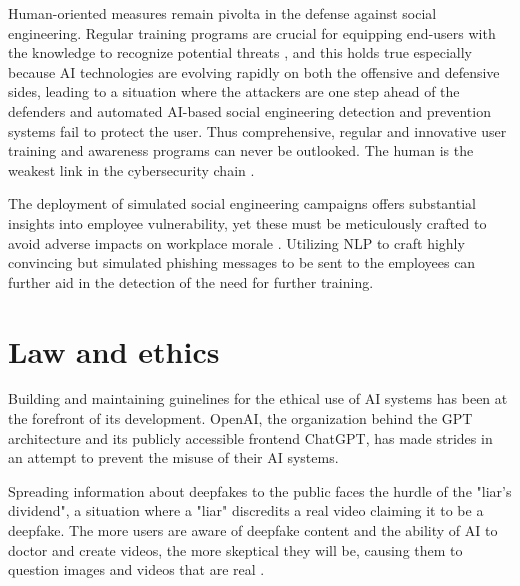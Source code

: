 Human-oriented measures remain pivolta in the defense against social engineering. Regular training programs are crucial for equipping end-users with the knowledge to recognize potential threats \citep{hadnagySocialEngineering2018}, and this holds true especially because AI technologies are evolving rapidly on both the offensive and defensive sides, leading to a situation where the attackers are one step ahead of the defenders and automated AI-based social engineering detection and prevention systems fail to protect the user. Thus comprehensive, regular and innovative user training and awareness programs can never be outlooked. The human is the weakest link in the cybersecurity chain \citep{mitnickArtDeceptionControlling2003}.

The deployment of simulated social engineering campaigns offers substantial insights into employee vulnerability, yet these must be meticulously crafted to avoid adverse impacts on workplace morale \citep{mitnickArtDeceptionControlling2003}. Utilizing NLP to craft highly convincing but simulated phishing messages to be sent to the employees can further aid in the detection of the need for further training.



















\section{Law and ethics}

\begin{comment}    
    - Deepfake content detection
    - Spear phishing detection
\end{comment}

Building and maintaining guinelines for the ethical use of AI systems has been at the forefront of its development. OpenAI, the organization behind the GPT architecture and its publicly accessible frontend ChatGPT, has made strides in an attempt to prevent the misuse of their AI systems.

Spreading information about deepfakes to the public faces the hurdle of the "liar's dividend", a situation where a "liar" discredits a real video claiming it to be a deepfake. The more users are aware of deepfake content and the ability of AI to doctor and create videos, the more skeptical they will be, causing them to question images and videos that are real \citep{blauthArtificialIntelligenceCrime2022}.

